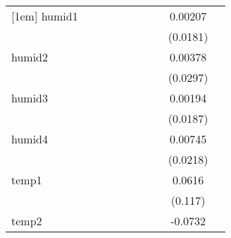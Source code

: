 {\begin{tabular}{l*{9}{c}}
[1em]
humid1      &                     &                     &                     &                     &                     &                     &                     &     0.00207         &                     \\
            &                     &                     &                     &                     &                     &                     &                     &    (0.0181)         &                     \\
[1em]
humid2      &                     &                     &                     &                     &                     &                     &                     &     0.00378         &                     \\
            &                     &                     &                     &                     &                     &                     &                     &    (0.0297)         &                     \\
[1em]
humid3      &                     &                     &                     &                     &                     &                     &                     &     0.00194         &                     \\
            &                     &                     &                     &                     &                     &                     &                     &    (0.0187)         &                     \\
[1em]
humid4      &                     &                     &                     &                     &                     &                     &                     &     0.00745         &                     \\
            &                     &                     &                     &                     &                     &                     &                     &    (0.0218)         &                     \\
[1em]
temp1       &                     &                     &                     &                     &                     &                     &                     &      0.0616         &                     \\
            &                     &                     &                     &                     &                     &                     &                     &     (0.117)         &                     \\
[1em]
temp2       &                     &                     &                     &                     &                     &                     &                     &     -0.0732\sym{*}  &                     \\

\end{tabular}}
